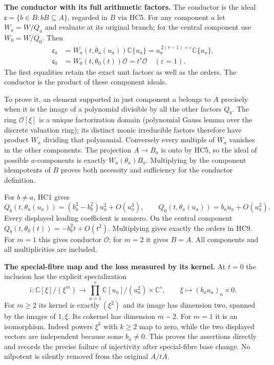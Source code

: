 \HC\textbf{The conductor with its full arithmetic factors.}
The conductor is the ideal
$\mathfrak c=\{b\in B:bB\subseteq A\}$, regarded in $B$ via HC5.
For any component $a$ let $W_a=W/Q_a$ and evaluate at its original
branch; for the central component use $W_0=W/Q_0$. Then
\[
 \begin{split}
 \mathfrak c_a&=W_a(t,\theta_a(u_a))\mathbb C\{u_a\}
            =u_a^{\,2(r-1)+\varepsilon}\mathbb C\{u_a\},\\
 \mathfrak c_0&=W_0(t,\theta_0(t))\mathcal O
            =t^r\mathcal O\quad(\varepsilon=1).
 \end{split}
 \tag{HC9}
\]
The first equalities retain the exact unit factors as well as the
orders. The conductor is the product of these component ideals.

To prove it, an element supported in just component $a$ belongs to
$A$ precisely when it is the image of a polynomial divisible by
all the other factors $Q_b$. The ring $\mathcal O[\xi]$ is a
unique factorization domain (polynomial Gauss lemma over the discrete
valuation ring); its distinct monic irreducible factors therefore
have product $W_a$ dividing that polynomial. Conversely every
multiple of $W_a$ vanishes in the other components. The projection
$A\to B_a$ is onto by HC5, so the ideal of possible $a$-components
is exactly $W_a(\theta_a)B_a$. Multiplying by the component
idempotents of $B$ proves both necessity and sufficiency for the
conductor definition.

For $b\ne a$, HC1 gives
\[
 Q_b(t,\theta_a(u_a))
      =(b_a^2-b_b^2)u_a^2+O(u_a^3),\qquad
 Q_0(t,\theta_a(u_a))=b_a u_a+O(u_a^2).
 \tag{HC10}
\]
Every displayed leading coefficient is nonzero. On the central
component $Q_b(t,\theta_0(t))=-b_b^2t+O(t^2)$. Multiplying gives
exactly the orders in HC9. For $m=1$ this gives conductor $\mathcal O$;
for $m=2$ it gives $B=A$. All components and all multiplicities
are included.

\HC\textbf{The special-fibre map and the loss measured by its kernel.}
At $t=0$ the inclusion has the explicit specialization
\[
 \bar\iota:\mathbb C[\xi]/(\xi^m)
   \longrightarrow
      \prod_{a=1}^r\mathbb C[u_a]/(u_a^2)\times\mathbb C^\varepsilon,
 \qquad \xi\longmapsto(b_au_a)_a\times0.
 \tag{HC11}
\]
For $m\ge2$ its kernel is exactly $(\xi^2)$ and its image has
dimension two, spanned by the images of $1,\xi$. Its cokernel
has dimension $m-2$. For $m=1$ it is an isomorphism.
Indeed powers $\xi^k$ with $k\ge2$ map to zero, while the two
displayed vectors are independent because some $b_a\ne0$.
This proves the assertions directly and records the precise failure
of injectivity after special-fibre base change. No nilpotent is
silently removed from the original $A/tA$.

